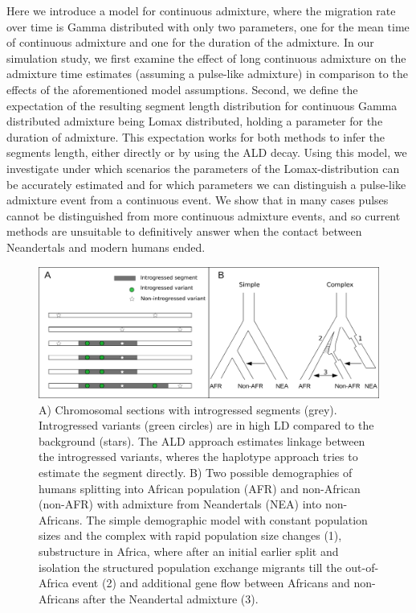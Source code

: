 \documentclass[]{article}
\begin{document}
Here we introduce a model for continuous admixture, where the migration
rate over time is Gamma distributed with only two parameters, one for
the mean time of continuous admixture and one for the duration of the
admixture. In our simulation study, we first examine the effect of long
continuous admixture on the admixture time estimates (assuming a pulse-like admixture) in comparison to
the effects of the aforementioned model assumptions. Second, we define
the expectation of the resulting segment length distribution for
continuous Gamma distributed admixture being Lomax distributed, holding
a parameter for the duration of admixture. This expectation works for
both methods to infer the segments length, either directly or by using
the ALD decay. Using this model, we investigate under which scenarios
the parameters of the Lomax-distribution can be accurately estimated and
for which parameters we can distinguish a pulse-like admixture event
from a continuous event. We show that in many cases pulses cannot be
distinguished from more continuous admixture events, and so current
methods are unsuitable to definitively answer when the contact between
Neandertals and modern humans ended.

\begin{figure}[H]

{\centering \includegraphics[width=0.95\linewidth]{Paper_Graphics_2} 

}

\caption{\label{fig:Into_fig} A) Chromosomal sections with introgressed segments (grey). Introgressed variants (green circles) are in high LD compared to the background (stars). The ALD approach estimates linkage between the introgressed variants, wheres the haplotype  approach tries to estimate the segment directly. B) Two possible demographies of humans splitting into African population (AFR) and non-African (non-AFR) with admixture from Neandertals (NEA) into non-Africans. The simple demographic model with constant population sizes and the complex with rapid population size changes (1), substructure in Africa, where after an initial earlier split and isolation the structured population exchange migrants till the out-of-Africa event (2) and additional gene flow between Africans and non-Africans after the Neandertal admixture (3).}\label{fig:Intro_fig}
\end{figure}
\end{document}
